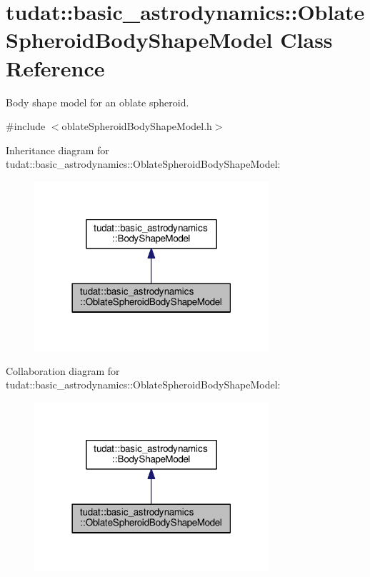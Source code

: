 \hypertarget{classtudat_1_1basic__astrodynamics_1_1OblateSpheroidBodyShapeModel}{}\section{tudat\+:\+:basic\+\_\+astrodynamics\+:\+:Oblate\+Spheroid\+Body\+Shape\+Model Class Reference}
\label{classtudat_1_1basic__astrodynamics_1_1OblateSpheroidBodyShapeModel}


Body shape model for an oblate spheroid.  




{\ttfamily \#include $<$oblate\+Spheroid\+Body\+Shape\+Model.\+h$>$}



Inheritance diagram for tudat\+:\+:basic\+\_\+astrodynamics\+:\+:Oblate\+Spheroid\+Body\+Shape\+Model\+:
\nopagebreak
\begin{figure}[H]
\begin{center}
\leavevmode
\includegraphics[width=246pt]{classtudat_1_1basic__astrodynamics_1_1OblateSpheroidBodyShapeModel__inherit__graph}
\end{center}
\end{figure}


Collaboration diagram for tudat\+:\+:basic\+\_\+astrodynamics\+:\+:Oblate\+Spheroid\+Body\+Shape\+Model\+:
\nopagebreak
\begin{figure}[H]
\begin{center}
\leavevmode
\includegraphics[width=246pt]{classtudat_1_1basic__astrodynamics_1_1OblateSpheroidBodyShapeModel__coll__graph}
\end{center}
\end{figure}
